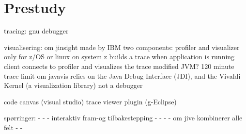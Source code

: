 \section{Prestudy}\label{Prestudy}

tracing:
gnu debugger

visualisering:
om jinsight
	made by IBM
	two components: profiler and visualizer
	only for z/OS or linux on system z
	builds a trace when application is running
	client connects to profiler and visualizes the trace
	modified JVM?
	120 minute trace limit
om javavis
	relies on the Java Debug Interface (JDI), and the Vivaldi Kernel (a visualization library)
	not a debugger
	
code canvas (visual studio)
trace viewer plugin (g-Eclipse)

spørringer:
-
-
-
interaktiv fram-og tilbakestepping
-
-
-
-
om jive
	kombinerer alle felt
-
-



